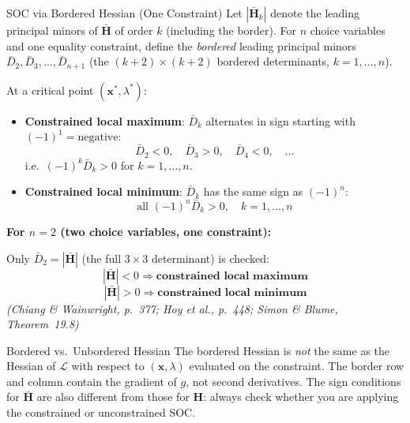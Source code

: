 \documentclass[12pt, a4paper]{article}
\theoremstyle{definition}
\newcommand{\bx}{\mathbf{x}}
\newcommand{\bH}{\mathbf{H}}
\begin{document}
\begin{thmbox}{SOC via Bordered Hessian (One Constraint)}
Let $|\bar{\bH}_k|$ denote the leading principal minors of $\bar{\bH}$ of
order $k$ (including the border). For $n$ choice variables and one equality
constraint, define the \emph{bordered} leading principal minors
$\bar{D}_2, \bar{D}_3, \ldots, \bar{D}_{n+1}$ (the $(k+2)\times(k+2)$
bordered determinants, $k=1,\ldots,n$).

At a critical point $(\bx^*, \lambda^*)$:
\begin{itemize}
  \item \textbf{Constrained local maximum}: $\bar{D}_k$ alternates in sign
        starting with $(-1)^1 = \text{negative}$:
        \[
          \bar{D}_2 < 0, \quad \bar{D}_3 > 0, \quad \bar{D}_4 < 0,\quad\ldots
        \]
        i.e.\ $(-1)^k \bar{D}_k > 0$ for $k = 1,\ldots, n$.
  \item \textbf{Constrained local minimum}: $\bar{D}_k$ has the same sign
        as $(-1)^n$:
        \[
          \text{all } (-1)^n \bar{D}_k > 0, \quad k = 1,\ldots, n
        \]
\end{itemize}

\textbf{For $n=2$ (two choice variables, one constraint):}

Only $\bar{D}_2 = |\bar{\bH}|$ (the full $3\times3$ determinant) is
checked:
\[
  |\bar{\bH}| < 0 \Rightarrow \textbf{constrained local maximum}
\]
\[
  |\bar{\bH}| > 0 \Rightarrow \textbf{constrained local minimum}
\]
\emph{(Chiang \& Wainwright, p.\ 377; Hoy et al., p.\ 448;
Simon \& Blume, Theorem~19.8)}
\end{thmbox}

\begin{warnbox}{Bordered vs.\ Unbordered Hessian}
The bordered Hessian is \emph{not} the same as the Hessian of $\mathcal{L}$
with respect to $(\bx, \lambda)$ evaluated on the constraint. The border
row and column contain the gradient of $g$, not second derivatives.
The sign conditions for $\bar{\bH}$ are also different from those for $\bH$:
always check whether you are applying the constrained or unconstrained SOC.
\end{warnbox}
\end{document}
